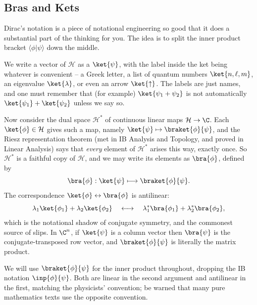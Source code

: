 \subsection{Bras and Kets}

Dirac's notation is a piece of notational engineering so good that it does a substantial part of the thinking for you. The idea is to split the inner product bracket $\langle \phi | \psi \rangle$ down the middle.

We write a vector of $\mathcal{H}$ as a  $\ket{\psi}$, with the label inside the ket being whatever is convenient -- a Greek letter, a list of quantum numbers $\ket{n, \ell, m}$, an eigenvalue $\ket{\lambda}$, or even an arrow $\ket{\uparrow}$. The labels are just names, and one must remember that (for example) $\ket{\psi_1 + \psi_2}$ is not automatically $\ket{\psi_1} + \ket{\psi_2}$ unless we say so.

Now consider the dual space $\mathcal{H}^*$ of continuous linear maps $\mathcal{H} \to \C$. Each $\ket{\phi} \in \mathcal{H}$ gives such a map, namely $\ket{\psi} \mapsto \braket{\phi}{\psi}$, and the Riesz representation theorem (met in IB Analysis and Topology, and proved in Linear Analysis) says that \emph{every} element of $\mathcal{H}^*$ arises this way, exactly once. So $\mathcal{H}^*$ is a faithful copy of $\mathcal{H}$, and we may write its elements as  $\bra{\phi}$, defined by
$$
\bra{\phi} : \ket{\psi} \longmapsto \braket{\phi}{\psi}.
$$
The correspondence $\ket{\phi} \leftrightarrow \bra{\phi}$ is antilinear:
$$
\lambda_1 \ket{\phi_1} + \lambda_2 \ket{\phi_2} \quad \longleftrightarrow \quad \lambda_1^* \bra{\phi_1} + \lambda_2^* \bra{\phi_2},
$$
which is the notational shadow of conjugate symmetry, and the commonest source of slips. In $\C^n$, if $\ket{\psi}$ is a column vector then $\bra{\psi}$ is the conjugate-transposed row vector, and $\braket{\phi}{\psi}$ is literally the matrix product.

\begin{notation}
    We will use $\braket{\phi}{\psi}$ for the inner product throughout, dropping the IB notation $\inp{\phi}{\psi}$. Both are linear in the second argument and antilinear in the first, matching the physicists' convention; be warned that many pure mathematics texts use the opposite convention.
\end{notation}

